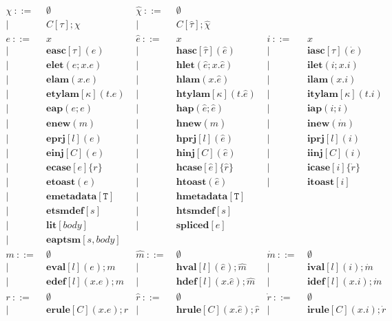\documentclass[letterpaper, notitlepage]{article}
\newcommand{\T}{\mathtt{T}}
\begin{document}
\[\begin{array}{rlrlrl}
	 \chi 			~::=&~	\emptyset					&\hat\chi ~::=&~	\emptyset\\
	 |~&	~C[\tau];\chi								&|~&  ~C[\hat\tau];\hat{\chi}\\
	e 			~::=&~ x 								&\hat{e}	~::=&~ 	x 										& i 		~::=&~ 	x\\
				| ~ &~ \mathbf{easc}[\tau](e)			& 		 	| ~ &~ 	\mathbf{hasc}[\hat\tau](\hat{e})		& 		 	| ~ &~	\mathbf{iasc}[\tau](\dot{e})\\
				| ~ &~ \mathbf{elet}(e; x.e)     		& 		 	| ~ &~ 	\mathbf{hlet}(\hat{e}; x.\hat{e})		& 		 	| ~ &~	\mathbf{ilet}(i;x.i)\\
				| ~ &~ \mathbf{elam}(x.e)     			& 		 	| ~ &~ 	\mathbf{hlam}(x.\hat{e})				& 		 	| ~ &~	\mathbf{ilam}(x.i)\\
				| ~ &~ \mathbf{etylam}[\kappa](t.e)     & 			| ~ &~  \mathbf{htylam}[\kappa](t.\hat{e})		& 			| ~ &~  \mathbf{itylam}[\kappa](t.i)\\
				| ~ &~ \mathbf{eap}(e;e)     			& 		 	| ~ &~ 	\mathbf{hap}(\hat{e};\hat{e})			& 		 	| ~ &~	\mathbf{iap}(i;i)\\
				| ~ &~ \mathbf{enew}(m)     			& 		 	| ~ &~	\mathbf{hnew}(\hat{m})					& 		 	| ~ &~	\mathbf{inew}(\dot{m})\\
				| ~ &~ \mathbf{eprj}[l](e)     			& 		 	| ~ &~	\mathbf{hprj}[l](\hat{e})				& 		 	| ~ &~	\mathbf{iprj}[l](i)\\
				| ~ &~ \mathbf{einj}[C](e)     			& 		 	| ~ &~	\mathbf{hinj}[C](\hat{e})				& 		 	| ~ &~	\mathbf{iinj}[C](i)\\
				| ~ &~ \mathbf{ecase}[e]\{r\}     		& 		 	| ~ &~	\mathbf{hcase}[\hat{e}]\{\hat{r}\}		& 		 	| ~ &~	\mathbf{icase}[i]\{\dot{r}\}\\
				| ~ &~ \mathbf{etoast}(e)     			& 		 	| ~ &~	\mathbf{htoast}(\hat{e})				& 		 	| ~ &~	\mathbf{itoast}[i]\\
				| ~ &~ \mathbf{emetadata}[\T]     		& 		 	| ~ &~	\mathbf{hmetadata}[\T]\\
				| ~ &~ \mathbf{etsmdef}[s]				& 			| ~ &~ 	\mathbf{htsmdef}[s]\\
				| ~ &~ \mathbf{lit}[body]				& 		 	| ~ &~ 	\mathbf{spliced}[e]\\
				| ~ &~ \mathbf{eaptsm}[s,body]\\
	m 			~::=&~ \emptyset						&\hat{m}	~::=&~ \emptyset								&\dot{m}	~::=&~ \emptyset\\
				| ~ &~ \mathbf{eval}[l](e);m 			&			| ~ &~ \mathbf{hval}[l](\hat{e});\hat{m} 		&			| ~ &~ \mathbf{ival}[l](i);\dot{m}\\
				| ~ &~ \mathbf{edef}[l](x.e);m 			&			| ~ &~ \mathbf{hdef}[l](x.\hat{e});\hat{m}		&			| ~ &~ \mathbf{idef}[l](x.i);\dot{m}\\
	r 			~::=&~ \emptyset 						&\hat{r} 	~::=&~ \emptyset 								&\dot{r} 	~::=&~ \emptyset\\
				| ~ &~ \mathbf{erule}[C](x.e);r 		& 			| ~ &~ \mathbf{hrule}[C](x.\hat{e});\hat{r} 	&			| ~ &~ \mathbf{irule}[C](x.i);\dot{r}
\end{array}
\]
\end{document}
